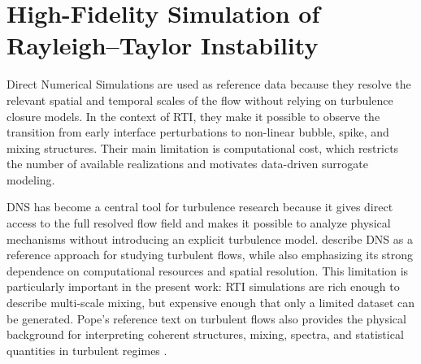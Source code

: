 \section{High-Fidelity Simulation of Rayleigh--Taylor Instability}

Direct Numerical Simulations are used as reference data because they resolve the relevant spatial and temporal scales of the flow without relying on turbulence closure models. In the context of RTI, they make it possible to observe the transition from early interface perturbations to non-linear bubble, spike, and mixing structures. Their main limitation is computational cost, which restricts the number of available realizations and motivates data-driven surrogate modeling.

DNS has become a central tool for turbulence research because it gives direct
access to the full resolved flow field and makes it possible to analyze
physical mechanisms without introducing an explicit turbulence model. \citep{MoinMahesh1998} describe DNS as a reference approach for studying turbulent flows, while
also emphasizing its strong dependence on computational resources and spatial
resolution. This limitation is particularly important in
the present work: RTI simulations are rich enough to describe multi-scale
mixing, but expensive enough that only a limited dataset can be generated.
Pope's reference text on turbulent flows also provides the physical background
for interpreting coherent structures, mixing, spectra, and statistical
quantities in turbulent regimes \citep{pope2000turbulent}.

